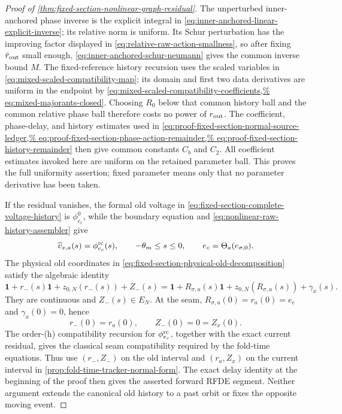 \begin{proof}[Proof of
\cref{thm:fixed-section-nonlinear-graph-residual}]
The unperturbed inner-anchored phase inverse is the explicit integral in
\cref{eq:inner-anchored-linear-explicit-inverse}; its relative norm is
uniform.  Its Schur perturbation has the improving factor displayed in
\cref{eq:relative-raw-action-smallness}, so after fixing
\(\bar r_{\rm out}\) small enough,
\cref{eq:inner-anchored-schur-neumann} gives the common inverse bound
\(M\).  The fixed-reference history recursion uses the scaled variables
in \cref{eq:mixed-scaled-compatibility-map}; its domain and first two
data derivatives are uniform in the endpoint by
\cref{eq:mixed-scaled-compatibility-coefficients,%
eq:mixed-majorants-closed}.  Choosing \(R_0\) below that common history
ball and the common relative phase ball therefore costs no power of
\(r_{\rm out}\).  The coefficient, phase-delay, and history estimates used
in
\cref{eq:proof-fixed-section-normal-source-ledger,%
eq:proof-fixed-section-phase-action-remainder,%
eq:proof-fixed-section-history-remainder}
then give common constants \(C_b\) and \(C_2\).  All coefficient estimates
invoked here are uniform on the retained parameter ball.  This proves the
full uniformity assertion; fixed parameter means only that no parameter
derivative has been taken.

If the residual vanishes,
the formal old voltage in
\cref{eq:fixed-section-complete-voltage-history} is
\(\phi_{e_c}^0\), while the boundary equation and
\cref{eq:nonlinear-raw-history-assembler} give
\[
 \widehat v_{x,a}(s)=\phi_{e_c}^{\rm rc}(s),
 \qquad -\theta_m\le s\le0,
 \qquad e_c=\Theta_a(e_{\sigma,0}).
\]
The physical old coordinates in
\cref{eq:fixed-section-physical-old-decomposition} satisfy the algebraic
identity
\begin{equation}
 \mathbf1+r_-(s)\mathbf1+z_{0,N}(r_-(s))+Z_-(s)
 =\mathbf1+R_{\sigma,a}(s)\mathbf1
       +z_{0,N}(R_{\sigma,a}(s))+\gamma_x(s).    \label{eq:proof-fixed-section-old-voltage-identity}
\end{equation}
They are continuous and \(Z_-(s)\in E_N\).  At the seam,
\(R_{\sigma,a}(0)=r_a(0)=e_c\) and
\(\gamma_x(0)=0\), hence
\[
 r_-(0)=r_a(0),\qquad Z_-(0)=0=Z_x(0).
\]
The order-(h) compatibility recursion for
\(\phi_{e_c}^{\rm rc}\), together with the exact current residual, gives
the classical seam compatibility required by the fold-time equations.
Thus use \((r_-,Z_-)\) on the old interval and \((r_a,Z_x)\) on the
current interval in
\cref{prop:fold-time-tracker-normal-form}.  The exact delay identity at the
beginning of the proof then gives the asserted forward RFDE segment.
Neither argument extends the canonical old history to a past orbit or fixes
the opposite moving event.
\end{proof}

